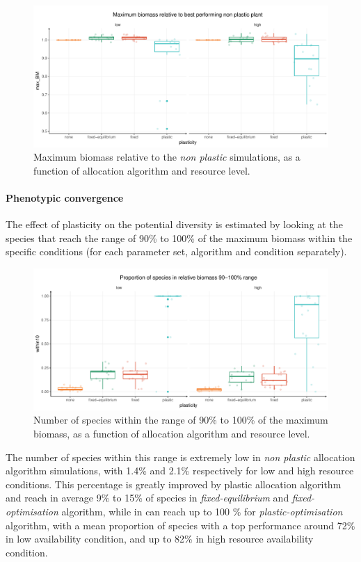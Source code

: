 \begin{figure}\label{fig:max_BM_pl}
\includegraphics[width = \textwidth]{./2_PP/Figures/Landscape/plot_maxBM_allocation.pdf}
\caption{Maximum biomass relative to the \textit{non plastic} simulations, as a function of allocation algorithm and resource level.}
\end{figure}

\paragraph{Phenotypic convergence}

The effect of plasticity on the potential diversity is estimated by looking at the species that reach the range of 90\% to 100\% of the maximum biomass within the specific conditions (for each parameter set, algorithm and condition separately).

\begin{figure}\label{fig:species_richness}
\includegraphics[width = \textwidth]{./2_PP/Figures/Landscape/plot_eveness.pdf}
\caption{Number of species within the range of 90\% to 100\% of the maximum biomass, as a function of allocation algorithm and resource level.}
\end{figure}

The number of species within this range is extremely low in \textit{non plastic} allocation algorithm simulations, with 1.4\% and 2.1\% respectively for low and high resource conditions. This percentage is greatly improved by plastic allocation algorithm and reach in average 9\% to 15\% of species in \textit{fixed-equilibrium} and \textit{fixed-optimisation} algorithm, while in can reach up to 100 \% for \textit{plastic-optimisation} algorithm, with a mean proportion of species with a top performance around 72\% in low availability condition, and up to 82\% in high resource availability condition.

